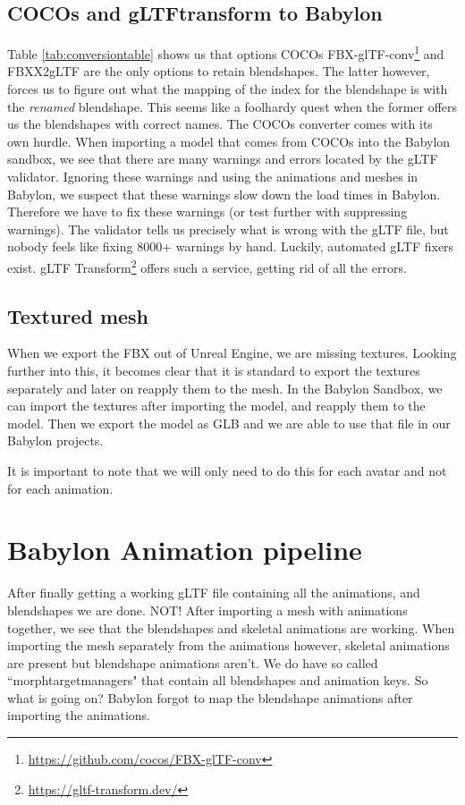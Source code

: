 \documentclass{uva-inf-article}
\begin{document}
\subsection{COCOs and gLTFtransform to Babylon}
Table \ref{tab:conversiontable} shows us that options COCOs FBX-glTF-conv\footnote{\url{https://github.com/cocos/FBX-glTF-conv}} and FBXX2gLTF are the only options to retain blendshapes. The latter however, forces us to figure out what the mapping of the index for the blendshape is with the \textit{renamed} blendshape. This seems like a foolhardy quest when the former offers us the blendshapes with correct names. The COCOs converter comes with its own hurdle. When importing a model that comes from COCOs into the Babylon sandbox, we see that there are many warnings and errors located by the gLTF validator. Ignoring these warnings and using the animations and meshes in Babylon, we suspect that these warnings slow down the load times in Babylon. Therefore we have to fix these warnings (or test further with suppressing warnings). The validator tells us precisely what is wrong with the gLTF file, but nobody feels like fixing 8000+ warnings by hand. Luckily, automated gLTF fixers exist. gLTF Transform\footnote{\url{https://gltf-transform.dev/}} offers such a service, getting rid of all the errors.

\subsection{Textured mesh}
When we export the FBX out of Unreal Engine, we are missing textures. Looking further into this, it becomes clear that it is standard to export the textures separately and later on reapply them to the mesh. In the Babylon Sandbox, we can import the textures after importing the model, and reapply them to the model. Then we export the model as GLB and we are able to use that file in our Babylon projects.

It is important to note that we will only need to do this for each avatar and not for each animation.

\section{Babylon Animation pipeline}
After finally getting a working gLTF file containing all the animations, and blendshapes we are done. NOT! After importing a mesh with animations together, we see that the blendshapes and skeletal animations are working. When importing the mesh separately from the animations however, skeletal animations are present but blendshape animations aren't. We do have so called ``morphtargetmanagers" that contain all blendshapes and animation keys. So what is going on? Babylon forgot to map the blendshape animations after importing the animations.
\end{document}
